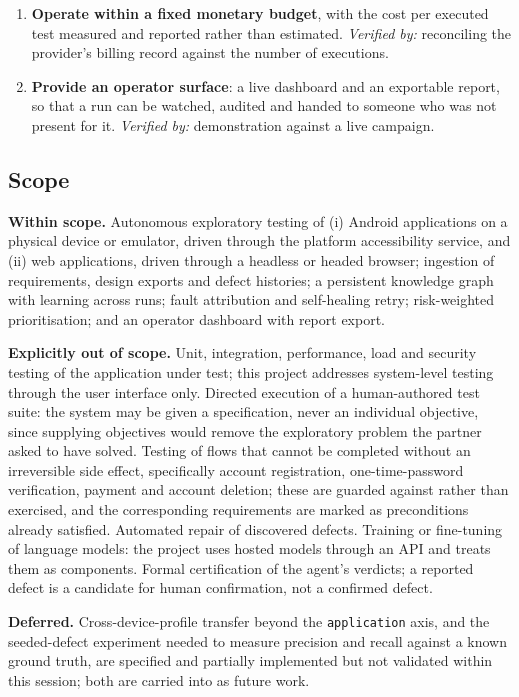 \begin{enumerate}[label=\textbf{O\arabic*.},leftmargin=3.2em]
  \item \textbf{Operate within a fixed monetary budget}, with the cost per
    executed test measured and reported rather than estimated.
    \emph{Verified by:} reconciling the provider's billing record against the
    number of executions.

  \item \textbf{Provide an operator surface}: a live dashboard and an exportable report, so that a run can be watched, audited and handed to
    someone who was not present for it.
    \emph{Verified by:} demonstration against a live campaign.
\end{enumerate}

\subsection*{Scope}

\textbf{Within scope.} Autonomous exploratory testing of (i) Android
applications on a physical device or emulator, driven through the platform
accessibility service, and (ii) web applications, driven through a headless or
headed browser; ingestion of requirements, design exports and defect histories;
a persistent knowledge graph with learning across runs; fault attribution and
self-healing retry; risk-weighted prioritisation; and an operator dashboard
with report export.

\textbf{Explicitly out of scope.} Unit, integration, performance, load and
security testing of the application under test; this project addresses
system-level testing through the user interface only. Directed execution of a
human-authored test suite: the system may be given a specification, never an
individual objective, since supplying objectives would remove the exploratory
problem the partner asked to have solved. Testing of flows that cannot be
completed without an irreversible side effect, specifically account
registration, one-time-password verification, payment and account deletion;
these are guarded against rather than exercised, and the corresponding
requirements are marked as preconditions already satisfied. Automated repair of
discovered defects. Training or fine-tuning of language models: the project
uses hosted models through an API and treats them as components. Formal
certification of the agent's verdicts; a reported defect is a candidate for
human confirmation, not a confirmed defect.

\textbf{Deferred.} Cross-device-profile transfer beyond the \texttt{application}
axis, and the seeded-defect experiment needed to measure precision and recall
against a known ground truth, are specified and partially implemented but not
validated within this session; both are carried into  as
future work.
